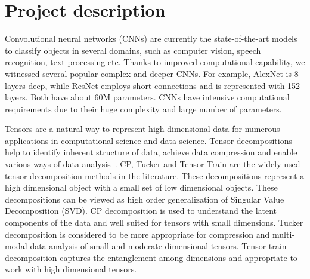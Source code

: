 \documentclass[11pt]{article}
\begin{document}
\section{Project description}

Convolutional neural networks  (CNNs) are currently the state-of-the-art models to classify objects in several domains, such as computer vision, speech recognition, text processing etc. Thanks to improved computational capability, we witnessed several popular complex and deeper CNNs. For example, AlexNet is 8 layers deep, while ResNet employs short connections and is represented with 152 layers. Both have about 60M parameters. CNNs have intensive computational requirements due to their huge complexity and large number of parameters. 

Tensors are a natural way to represent high dimensional data for numerous applications in computational science and data science. Tensor decompositions help to identify inherent structure of data, achieve data compression and enable various ways of data analysis~\cite{KB-SIAMReview2009}. CP, Tucker and Tensor Train are the widely used tensor decomposition methods in the literature. These decompositions represent a high dimensional object with a small set of low dimensional objects. These decompositions can be viewed as high order generalization of Singular Value Decomposition (SVD). CP decomposition is used to understand the latent components of the data and well suited for tensors with small dimensions. Tucker decomposition is considered to be more appropriate for compression and multi-modal data analysis of small and moderate dimensional tensors. Tensor train decomposition captures the entanglement among dimensions and appropriate to work with high dimensional tensors.
\end{document}
